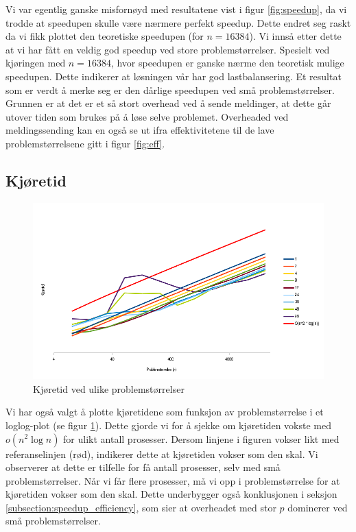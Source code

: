 \documentclass{article}
\begin{document}
Vi var egentlig ganske misfornøyd med resultatene vist i figur \ref{fig:speedup}, da vi trodde at speedupen skulle være nærmere perfekt speedup. Dette endret seg raskt da vi fikk plottet den teoretiske speedupen (for $n = 16384$). Vi innså etter dette at vi har fått en veldig god speedup ved store problemstørrelser. Spesielt ved kjøringen med $n = 16384$, hvor speedupen er ganske nærme den teoretisk mulige speedupen. Dette indikerer at løsningen vår har god lastbalansering. Et resultat som er verdt å merke seg er den dårlige speedupen ved små problemstørrelser. Grunnen er at det er et så stort overhead ved å sende meldinger, at dette går utover tiden som brukes på å løse selve problemet. Overheaded ved meldingssending kan en også se ut ifra effektivitetene til de lave problemstørrelsene gitt i figur \ref{fig:eff}. 

\subsection{Kjøretid}
\begin{figure}[t]
	\centering
	\includegraphics[width=12cm]{img/runtime_n.png}
	\caption{Kjøretid ved ulike problemstørrelser}		
	\label{fig:runtime_n}
\end{figure}
Vi har også valgt å plotte kjøretidene som funksjon av problemstørrelse i et loglog-plot (se figur \ref{fig:runtime_n}). Dette gjorde vi for å sjekke om kjøretiden vokste med $o(n^2 \log n)$ for ulikt antall prosesser. Dersom linjene i figuren vokser likt med referanselinjen (rød), indikerer dette at kjøretiden vokser som den skal. Vi observerer at dette er tilfelle for få antall prosesser, selv med små problemstørrelser. Når vi får flere prosesser, må vi opp i problemstørrelse for at kjøretiden vokser som den skal. Dette underbygger også konklusjonen i seksjon \ref{subsection:speedup_efficiency}, som sier at overheadet med stor $p$ dominerer ved små problemstørrelser.
\end{document}
